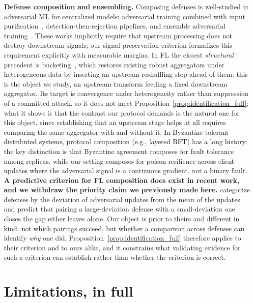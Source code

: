 \documentclass{article}
\begin{document}
\textbf{Defense composition and ensembling.} Composing defenses is well-studied in adversarial ML for centralized models: adversarial training combined with input purification~\citep{croce2020robustbench}, detection-then-rejection pipelines, and ensemble adversarial training~\citep{tramer2018ensemble}. These works implicitly require that upstream processing does not destroy downstream signals; our signal-preservation criterion formalizes this requirement explicitly with measurable margins. In FL the closest \emph{structural} precedent is bucketing~\citep{karimireddy2022byzantine}, which restores existing robust aggregators under heterogeneous data by inserting an upstream reshuffling step ahead of them: this is the object we study, an upstream transform feeding a fixed downstream aggregator. Its target is convergence under heterogeneity rather than suppression of a committed attack, so it does not meet Proposition~\ref{prop:identification_full}; what it shows is that the contrast our protocol demands is the natural one for this object, since establishing that an upstream stage helps at all requires comparing the same aggregator with and without it. In Byzantine-tolerant distributed systems, protocol composition (e.g., layered BFT) has a long history; the key distinction is that Byzantine agreement composes for fault tolerance among replicas, while our setting composes for poison resilience across client updates where the adversarial signal is a continuous gradient, not a binary fault. \textbf{A predictive criterion for FL composition does exist in recent work, and we withdraw the priority claim we previously made here.} \citet{fenaux2025hammer} categorize defenses by the deviation of adversarial updates from the mean of the updates and predict that pairing a large-deviation defense with a small-deviation one closes the gap either leaves alone. Our object is prior to theirs and different in kind: not which pairings succeed, but whether a comparison across defenses can identify \emph{why} one did. Proposition~\ref{prop:identification_full} therefore applies to their criterion and to ours alike, and it constrains what validating evidence for such a criterion can establish rather than whether the criterion is correct.

\section{Limitations, in full}
\label{sec:limitations}
\end{document}
